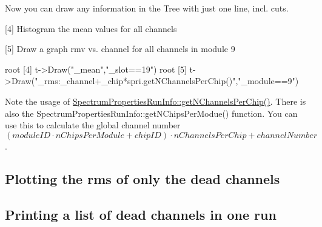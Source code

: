 Now you can draw any information in the Tree with just one line, incl. cuts. \begin{DoxyItemize}
\item \mbox{[}4\mbox{]} Histogram the mean values for all channels \item \mbox{[}5\mbox{]} Draw a graph rmv vs. channel for all channels in module 9 
\begin{DoxyCode}
root [4] t->Draw(\textcolor{stringliteral}{"\_mean"},\textcolor{stringliteral}{"\_slot==19"})
root [5] t->Draw(\textcolor{stringliteral}{"\_rms:\_channel+\_chip*spri.getNChannelsPerChip()"},\textcolor{stringliteral}{"\_module==9"}) 
\end{DoxyCode}
 Note the usage of \hyperlink{class_spectrum_properties_run_info_a3d9d8e0ae2cef40794561409120e257c}{Spectrum\-Properties\-Run\-Info\-::get\-N\-Channels\-Per\-Chip()}. There is also the Spectrum\-Properties\-Run\-Info\-::get\-N\-Chips\-Per\-Modue() function. You can use this to calculate the global channel number $( moduleID \cdot nChipsPerModule + chipID ) \cdot nChannelsPerChip + channelNumber $.\end{DoxyItemize}
\hypertarget{_examples_plotDead}{}\subsection{Plotting the rms of only the dead channels}\label{_examples_plotDead}
\hypertarget{_examples_printDead}{}\subsection{Printing a list of dead channels in one run}\label{_examples_printDead}
